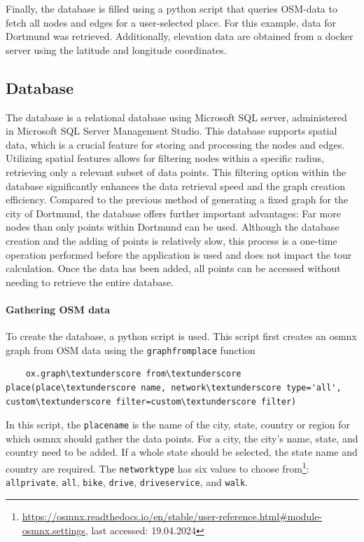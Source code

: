 Finally, the database is filled using a python script that queries OSM-data to fetch all nodes and edges for a user-selected place.
For this example, data for Dortmund was retrieved.
Additionally, elevation data are obtained from a docker server using the latitude and longitude coordinates.



\subsection{Database}
\label{subsection:database}

The database is a relational database using Microsoft SQL server, administered in Microsoft SQL Server Management Studio.
This database supports spatial data, which is a crucial feature for storing and processing the nodes and edges.
Utilizing spatial features allows for filtering nodes within a specific radius, retrieving only a relevant subset of data points.
This filtering option within the database significantly enhances the data retrieval speed and the graph creation efficiency.
Compared to the previous method of generating a fixed graph for the city of Dortmund, the database offers further important advantages:
Far more nodes than only points within Dortmund can be used.
Although the database creation and the adding of points is relatively slow, this process is a one-time operation performed before the application is used and does not impact the tour calculation. 
Once the data has been added, all points can be accessed without needing to retrieve the entire database.

\paragraph{Gathering OSM data}

To create the database, a python script is used. 
This script first creates an osmnx graph from OSM data using the \texttt{graph\textunderscore from\textunderscore place} function
\begin{lstlisting}
	ox.graph\textunderscore from\textunderscore place(place\textunderscore name, network\textunderscore type='all', custom\textunderscore filter=custom\textunderscore filter)
\end{lstlisting}

In this script, the \texttt{place\textunderscore name} is the name of the city, state, country or region for which osmnx should gather the data points.
For a city, the city's name, state, and country need to be added. 
If a whole state should be selected, the state name and country are required.
The \texttt{network\textunderscore type} has six values to choose from\footnote{\url{https://osmnx.readthedocs.io/en/stable/user-reference.html\#module-osmnx.settings}, last accessed: 19.04.2024}: \texttt{all\textunderscore private}, \texttt{all}, \texttt{bike}, \texttt{drive}, \texttt{drive\textunderscore service}, and \texttt{walk}. 

